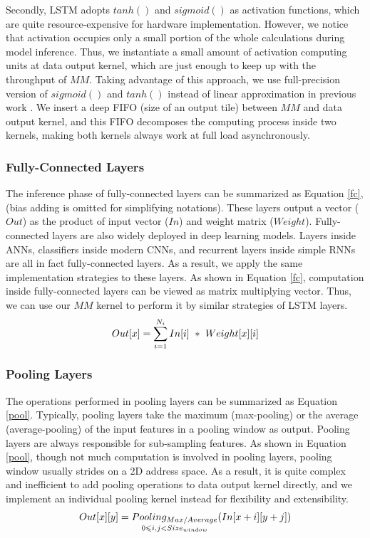 \documentclass{acm_proc_article-sp-copy}
\begin{document}
\vspace{-10pt}Secondly, LSTM adopts $tanh()$ and $sigmoid()$ as activation functions, which are quite resource-expensive for hardware implementation. However, we notice that activation occupies only a small portion of the whole calculations during model inference. Thus, we instantiate a small amount of activation computing units at data output kernel, which are just enough to keep up with the throughput of $MM$. Taking advantage of this approach, we use full-precision version of $sigmoid()$ and $tanh()$ instead of linear approximation in previous work \cite{fccm'15}. We insert a deep FIFO (size of an output tile) between $MM$ and data output kernel, and this FIFO decomposes the computing process inside two kernels, making both kernels always work at full load asynchronously.


\subsubsection{Fully-Connected Layers}
The inference phase of fully-connected layers can be summarized as Equation \ref{fc}, (bias adding is omitted for simplifying notations). These layers output a vector ($Out$) as the product of input vector ($In$) and weight matrix ($Weight$). Fully-connected layers are also widely deployed in deep learning models. Layers inside ANNs, classifiers inside modern CNNs, and recurrent layers inside simple RNNs are all in fact fully-connected layers. As a result, we apply the same implementation strategies to these layers. As shown in Equation \ref{fc}, computation inside fully-connected layers can be viewed as matrix multiplying vector. Thus, we can use our $MM$ kernel to perform it by similar strategies of LSTM layers. 
\vspace{-5pt}
\begin{equation}
\centering
Out[x]=\sum_{i=1}^{N_i}In[i]\ *\ Weight[x][i]
\label{fc}
\end{equation}

\subsubsection{Pooling Layers}
The operations performed in pooling layers can be summarized as Equation \ref{pool}. Typically, pooling layers take the maximum (max-pooling) or the average (average-pooling) of the input features in a pooling window as output. Pooling layers are always responsible for sub-sampling features. As shown in Equation \ref{pool}, though not much computation is involved in pooling layers, pooling window usually strides on a 2D address space. As a result, it is quite complex and inefficient to add pooling operations to data output kernel directly, and we implement an individual pooling kernel instead for flexibility and extensibility.
\vspace{-3pt}
\begin{equation}
\centering
Out[x][y]= \mathop{Pooling_{Max/Average}}\limits_{0\leqslant i,j<Size_{window}}(In[x+i][y+j])
\label{pool}
\end{equation}
\end{document}

